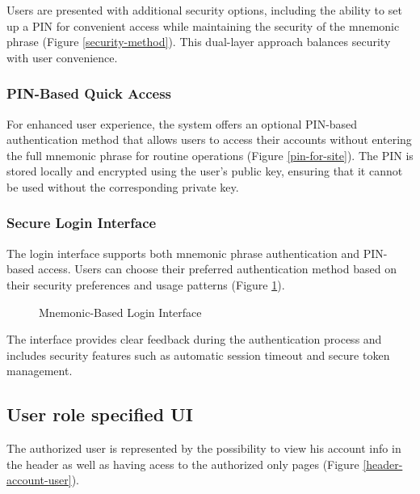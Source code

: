 Users are presented with additional security options, including the ability to set up a PIN for convenient access while maintaining the security of the mnemonic phrase (Figure \ref{security-method}). This dual-layer approach balances security with user convenience.

\subsubsection{PIN-Based Quick Access}
For enhanced user experience, the system offers an optional PIN-based authentication method that allows users to access their accounts without entering the full mnemonic phrase for routine operations (Figure \ref{pin-for-site}). The PIN is stored locally and encrypted using the user's public key, ensuring that it cannot be used without the corresponding private key.

\subsubsection{Secure Login Interface}
The login interface supports both mnemonic phrase authentication and PIN-based access. Users can choose their preferred authentication method based on their security preferences and usage patterns (Figure \ref{mnemonic-login}).

\begin{figure}[H]
    \centering
    \caption{Mnemonic-Based Login Interface}
    \label{mnemonic-login}
\end{figure}

The interface provides clear feedback during the authentication process and includes security features such as automatic session timeout and secure token management.

\subsection{User role specified UI}
The authorized user is represented by the possibility to view his account info in the header as well as having acess to the authorized only pages (Figure \ref{header-account-user}).


